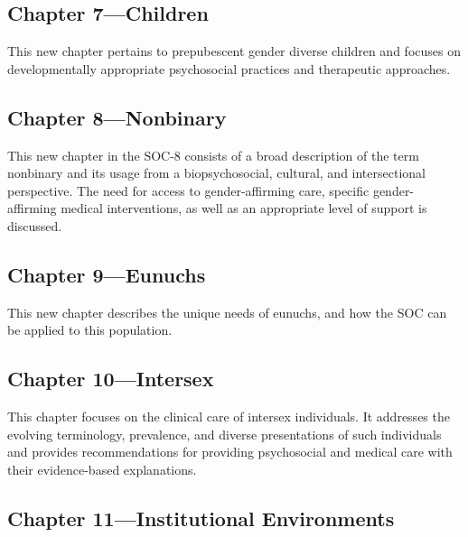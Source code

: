 \documentclass[
]{book}
\begin{document}
\hypertarget{chapter-7children}{%
\subsection*{Chapter 7---Children}\label{chapter-7children}}

This new chapter pertains to prepubescent gender
diverse children and focuses on developmentally
appropriate psychosocial practices and therapeutic
approaches.

\hypertarget{chapter-8nonbinary}{%
\subsection*{Chapter 8---Nonbinary}\label{chapter-8nonbinary}}

This new chapter in the SOC-8 consists of a
broad description of the term nonbinary and its
usage from a biopsychosocial, cultural, and intersectional perspective. The need for access to
gender-affirming care, specific gender-affirming
medical interventions, as well as an appropriate
level of support is discussed.

\hypertarget{chapter-9eunuchs}{%
\subsection*{Chapter 9---Eunuchs}\label{chapter-9eunuchs}}

This new chapter describes the unique needs of
eunuchs, and how the SOC can be applied to
this population.

\hypertarget{chapter-10intersex}{%
\subsection*{Chapter 10---Intersex}\label{chapter-10intersex}}

This chapter focuses on the clinical care of intersex individuals. It addresses the evolving terminology, prevalence, and diverse presentations of
such individuals and provides recommendations
for providing psychosocial and medical care with
their evidence-based explanations.

\hypertarget{chapter-11institutional-environments}{%
\subsection*{Chapter 11---Institutional Environments}\label{chapter-11institutional-environments}}
\end{document}
